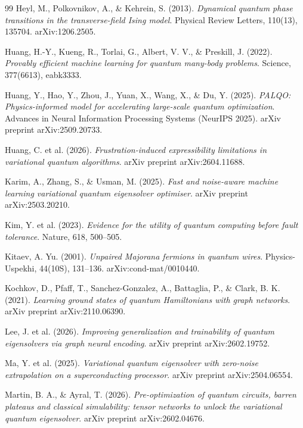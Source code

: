 \documentclass[11pt,a4paper,spanish]{book}
\begin{document}
\begin{thebibliography}{99}
 Heyl, M., Polkovnikov, A., \& Kehrein, S. (2013). \emph{Dynamical quantum phase transitions in the transverse-field Ising model}. Physical Review Letters, 110(13), 135704. arXiv:1206.2505.

 Huang, H.-Y., Kueng, R., Torlai, G., Albert, V. V., \& Preskill, J. (2022). \emph{Provably efficient machine learning for quantum many-body problems}. Science, 377(6613), eabk3333.

 Huang, Y., Hao, Y., Zhou, J., Yuan, X., Wang, X., \& Du, Y. (2025). \emph{PALQO: Physics-informed model for accelerating large-scale quantum optimization}. Advances in Neural Information Processing Systems (NeurIPS 2025). arXiv preprint arXiv:2509.20733.

 Huang, C. et al. (2026). \emph{Frustration-induced expressibility limitations in variational quantum algorithms}. arXiv preprint arXiv:2604.11688.

 Karim, A., Zhang, S., \& Usman, M. (2025). \emph{Fast and noise-aware machine learning variational quantum eigensolver optimiser}. arXiv preprint arXiv:2503.20210.

 Kim, Y. et al. (2023). \emph{Evidence for the utility of quantum computing before fault tolerance}. Nature, 618, 500--505.

 Kitaev, A. Yu. (2001). \emph{Unpaired Majorana fermions in quantum wires}. Physics-Uspekhi, 44(10S), 131--136. arXiv:cond-mat/0010440.

 Kochkov, D., Pfaff, T., Sanchez-Gonzalez, A., Battaglia, P., \& Clark, B. K. (2021). \emph{Learning ground states of quantum Hamiltonians with graph networks}. arXiv preprint arXiv:2110.06390.

 Lee, J. et al. (2026). \emph{Improving generalization and trainability of quantum eigensolvers via graph neural encoding}. arXiv preprint arXiv:2602.19752.

 Ma, Y. et al. (2025). \emph{Variational quantum eigensolver with zero-noise extrapolation on a superconducting processor}. arXiv preprint arXiv:2504.06554.

 Martin, B. A., \& Ayral, T. (2026). \emph{Pre-optimization of quantum circuits, barren plateaus and classical simulability: tensor networks to unlock the variational quantum eigensolver}. arXiv preprint arXiv:2602.04676.


\end{thebibliography}
\end{document}

